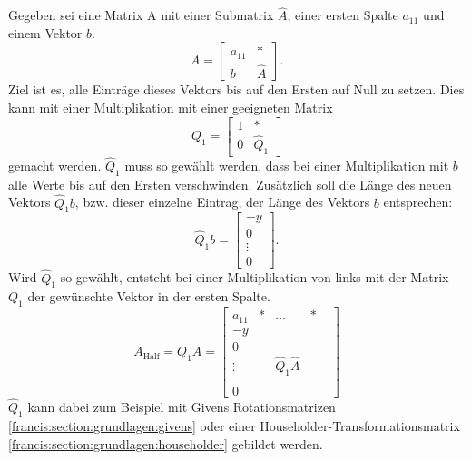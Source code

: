 Gegeben sei eine Matrix A mit einer Submatrix $\hat{A}$, einer ersten Spalte $a_{11}$ und einem Vektor $b$.
\begin{equation}
A=
\begin{bmatrix}
a_{11} & *\\
b & \hat{A}
\end{bmatrix}.
\end{equation}
Ziel ist es, alle Einträge dieses Vektors bis auf den Ersten auf Null zu setzen.
Dies kann mit einer Multiplikation mit einer geeigneten Matrix
\begin{equation}
Q_{1}=
\begin{bmatrix}
	1 & *\\
	0 & \hat{Q}_1
\end{bmatrix}
\end{equation}
gemacht werden.
$\hat{Q}_1$ muss so gewählt werden, dass bei einer Multiplikation mit $b$ alle Werte bis auf den Ersten verschwinden.
Zusätzlich soll die Länge des neuen Vektors $\hat{Q}_1b$, bzw. dieser einzelne Eintrag, der Länge des Vektors $b$ entsprechen:
\begin{equation}
\hat{Q}_1b=
\begin{bmatrix}
-y\\
0\\
\vdots\\
0
\end{bmatrix}.
\end{equation}
Wird $\hat{Q}_1$ so gewählt, entsteht bei einer Multiplikation von links mit der Matrix $Q_1$ der gewünschte Vektor in der ersten Spalte.
\begin{equation}
A_{\text{Half}}=Q_{1}A=
\begin{bmatrix}
a_{11} & * & \dots & *\\
-y & \\
0 & & & &\\
\vdots & &\hat{Q}_1\hat{A} & &\\
 & & & &\\
0 & & & &
\end{bmatrix}
\end{equation}
$\hat{Q}_1$ kann dabei zum Beispiel mit Givens Rotationsmatrizen \ref{francis:section:grundlagen:givens} oder einer Householder-Trans\-for\-ma\-tions\-ma\-trix \ref{francis:section:grundlagen:householder} gebildet werden.

